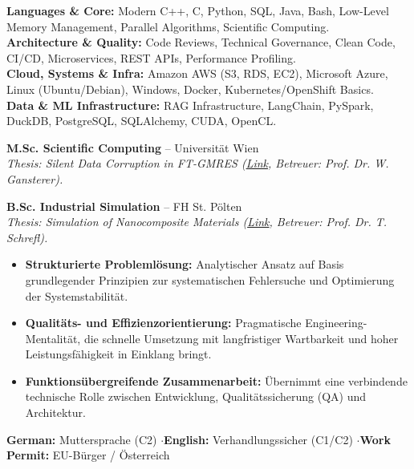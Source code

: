 \documentclass[10pt,a4paper]{article}
\begin{document}
\textbf{Languages \& Core:} Modern C++, C, Python, SQL, Java, Bash, Low-Level Memory Management, Parallel Algorithms, Scientific Computing.\\[0.05em]
\textbf{Architecture \& Quality:} Code Reviews, Technical Governance, Clean Code, CI/CD, Microservices, REST APIs, Performance Profiling.\\[0.05em]
\textbf{Cloud, Systems \& Infra:} Amazon AWS (S3, RDS, EC2), Microsoft Azure, Linux (Ubuntu/Debian), Windows, Docker, Kubernetes/OpenShift Basics.\\[0.05em]
\textbf{Data \& ML Infrastructure:} RAG Infrastructure, LangChain, PySpark, DuckDB, PostgreSQL, SQLAlchemy, CUDA, OpenCL.


\textbf{M.Sc. Scientific Computing} -- Universität Wien \\
\textit{Thesis: Silent Data Corruption in FT-GMRES (\href{https://utheses.univie.ac.at/detail/40917/}{Link}, Betreuer: Prof. Dr. W. Gansterer).}

\vspace{0.1cm}
\textbf{B.Sc. Industrial Simulation} -- FH St. Pölten \\
\textit{Thesis: Simulation of Nanocomposite Materials (\href{\meinGithub/thesis/blob/master/Bakkarbeit_final.pdf}{Link}, Betreuer: Prof. Dr. T. Schrefl).}

\newcommand{\engineeringApproachde}{%
\cvsection{Technischer Ansatz & Arbeitsweise}%
\begin{itemize}[leftmargin=*, itemsep=2pt]%
\item \textbf{Strukturierte Problemlösung:} Analytischer Ansatz auf Basis grundlegender Prinzipien zur systematischen Fehlersuche und Optimierung der Systemstabilität.%
\item \textbf{Qualitäts- und Effizienzorientierung:} Pragmatische Engineering-Mentalität, die schnelle Umsetzung mit langfristiger Wartbarkeit und hoher Leistungsfähigkeit in Einklang bringt.%
\item \textbf{Funktionsübergreifende Zusammenarbeit:} Übernimmt eine verbindende technische Rolle zwischen Entwicklung, Qualitätssicherung (QA) und Architektur.%
\end{itemize}%
}

\engineeringApproachde



\textbf{German:} Muttersprache (C2) \quad$\cdot$\quad \textbf{English:} Verhandlungssicher (C1/C2) \quad$\cdot$\quad \textbf{Work Permit:} EU-Bürger / Österreich
\end{document}
